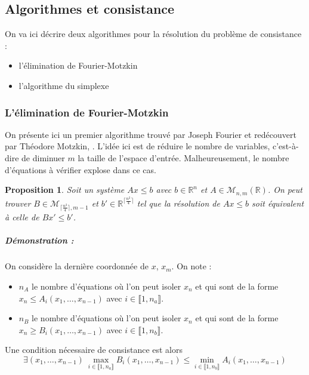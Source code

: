 \documentclass[10pt,a4paper]{article}
\newtheorem{prop}{Proposition}
\begin{document}
\subsection{Algorithmes et consistance}

On va ici décrire deux algorithmes pour la résolution du problème de consistance :
\begin{itemize}
\item l'élimination de Fourier-Motzkin
\item l'algorithme du simplexe
\end{itemize}

\subsubsection{L'élimination de Fourier-Motzkin}
On présente ici un premier algorithme trouvé par Joseph Fourier et redécouvert par Théodore Motzkin, \cite{motzkin1952theory}.
L'idée ici est de réduire le nombre de variables, c'est-à-dire de diminuer $m$ la taille de l'espace d'entrée. Malheureusement, le nombre d'équations à vérifier explose dans ce cas. 

\begin{prop}
Soit un système $Ax \le b$ avec $b \in \mathbb{R}^n$ et $A \in \mathcal{M}_{n,m}(\mathbb{R})$. On peut trouver $B \in \mathcal{M}_{\lceil \frac{ n^2}{4} \rceil,m-1}$ et $b' \in \mathbb{R}^{\lceil\frac{n^2}{4} \rceil}$ tel que la résolution de $Ax \le b$ soit équivalent à celle de $Bx' \le b'$.
\end{prop}

\subparagraph{Démonstration :} On considère la dernière coordonnée de $x$, $x_m$. On note :
\begin{itemize}
\item $n_A$ le nombre d'équations où l'on peut isoler $x_n$ et qui sont de la forme $x_n \le A_i(x_1, \dots, x_{n-1})$ avec $i \in \llbracket 1,n_a \rrbracket$.
\item $n_B$ le nombre d'équations où l'on peut isoler $x_n$ et qui sont de la forme $x_n \ge B_i(x_1, \dots, x_{n-1})$ avec $i \in \llbracket 1,n_b \rrbracket$.
\end{itemize} 

Une condition nécessaire de consistance est alors 
\begin{equation}
\exists (x_1,\dots,x_{n-1}) \ \underset{i \in \llbracket 1,n_a \rrbracket}{\max}B_i(x_1,\dots,x_{n-1}) \le \underset{i \in \llbracket 1,n_b \rrbracket}{\min}A_i(x_1,\dots,x_{n-1})
\end{equation}
\end{document}
